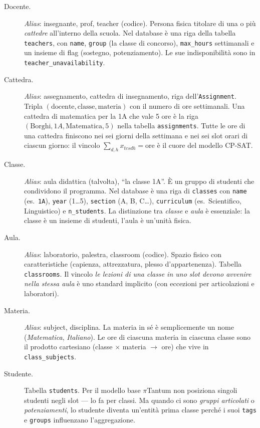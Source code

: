 \begin{description}
\item[Docente.]
  \emph{Alias}: insegnante, prof, teacher (codice). Persona
  fisica titolare di una o pi\`u \emph{cattedre} all'interno
  della scuola. Nel database \`e una riga della tabella
  \texttt{teachers}, con \texttt{name}, \texttt{group} (la
  classe di concorso), \texttt{max\_hours} settimanali e un
  insieme di flag (sostegno, potenziamento). Le sue
  indisponibilit\`a sono in \texttt{teacher\_unavailability}.

\item[Cattedra.]
  \emph{Alias}: assegnamento, cattedra di insegnamento, riga
  dell'\texttt{Assignment}. Tripla
  $(\text{docente},\text{classe},\text{materia})$ con il
  numero di ore settimanali. Una cattedra di matematica per
  la 1A che vale 5 ore \`e la riga
  $(\text{Borghi}, 1A, \text{Matematica}, 5)$ nella tabella
  \texttt{assignments}. Tutte le ore di una cattedra finiscono
  nei sei giorni della settimana e nei sei slot orari di ciascun
  giorno: il vincolo $\sum_{d,h} x_{tcsdh} = \text{ore}$ \`e il
  cuore del modello CP-SAT.

\item[Classe.]
  \emph{Alias}: aula didattica (talvolta), ``la classe 1A''.
  \`E un gruppo di studenti che condividono il programma. Nel
  database \`e una riga di \texttt{classes} con \texttt{name}
  (es.\ \texttt{1A}), \texttt{year} (1\ldots5), \texttt{section}
  (A, B, C\ldots), \texttt{curriculum} (es.\ Scientifico,
  Linguistico) e \texttt{n\_students}. La distinzione tra
  \emph{classe} e \emph{aula} \`e essenziale: la classe \`e un
  insieme di studenti, l'aula \`e un'unit\`a fisica.

\item[Aula.]
  \emph{Alias}: laboratorio, palestra, classroom (codice).
  Spazio fisico con caratteristiche (capienza,
  attrezzatura, plesso d'appartenenza). Tabella
  \texttt{classrooms}. Il vincolo \emph{le lezioni di una
  classe in uno slot devono avvenire nella stessa aula} \`e
  uno standard implicito (con eccezioni per articolazioni e
  laboratori).

\item[Materia.]
  \emph{Alias}: subject, disciplina. La materia in s\'e \`e
  semplicemente un nome (\emph{Matematica}, \emph{Italiano}).
  Le ore di ciascuna materia in ciascuna classe sono il
  prodotto cartesiano (classe $\times$ materia $\to$ ore) che
  vive in \texttt{class\_subjects}.

\item[Studente.]
  Tabella \texttt{students}. Per il modello base $\pi$Tantum
  non posiziona singoli studenti negli slot --- lo fa per
  classi. Ma quando ci sono \emph{gruppi articolati} o
  \emph{potenziamenti}, lo studente diventa un'entit\`a
  prima classe perch\'e i suoi \texttt{tags} e
  \texttt{groups} influenzano l'aggregazione.
\end{description}

